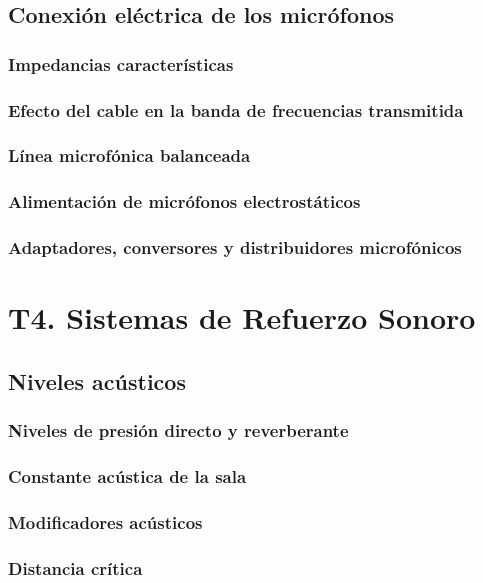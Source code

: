 \documentclass[a4paper, 8pt]{extarticle}
\begin{document}
\begin{multicols}{3}
  \subsection{Conexión eléctrica de los micrófonos}
  \subsubsection{Impedancias características}
  \subsubsection{Efecto del cable en la banda de frecuencias transmitida}
  \subsubsection{Línea microfónica balanceada}
  \subsubsection{Alimentación de micrófonos electrostáticos}
  \subsubsection{Adaptadores, conversores y distribuidores microfónicos}

  \newpage
  \section{T4. Sistemas de Refuerzo Sonoro}

  \subsection{Niveles acústicos}
  \subsubsection{Niveles de presión directo y reverberante}
  \subsubsection{Constante acústica de la sala}
  \subsubsection{Modificadores acústicos}
  \subsubsection{Distancia crítica}

\end{multicols}
\end{document}
